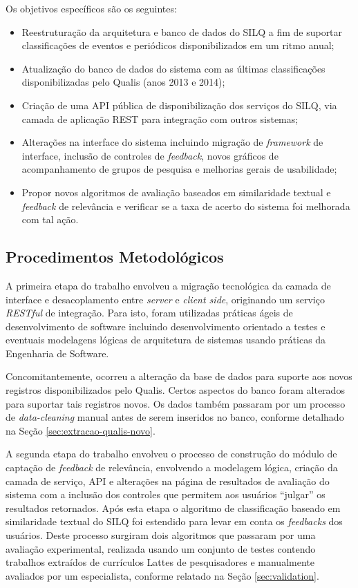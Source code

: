 \documentclass[12pt]{article}
\newcommand{\quotes}[1]{``#1''}
\begin{document}
Os objetivos específicos são os seguintes:

\begin{itemize}
    \item Reestruturação da arquitetura e banco de dados do SILQ a fim de suportar classificações de eventos e periódicos disponibilizados em um ritmo anual;

    \item Atualização do banco de dados do sistema com as últimas classificações disponibilizadas pelo Qualis (anos 2013 e 2014);

    \item Criação de uma API pública de disponibilização dos serviços do SILQ, via camada de aplicação REST para integração com outros sistemas;

    \item Alterações na interface do sistema incluindo migração de \textit{framework} de interface, inclusão de controles de \textit{feedback}, novos gráficos de acompanhamento de grupos de pesquisa e melhorias gerais de usabilidade;

    \item Propor novos algoritmos de avaliação baseados em similaridade textual e \textit{feedback} de relevância e verificar se a taxa de acerto do sistema foi melhorada com tal ação.
\end{itemize}

\subsection{Procedimentos Metodológicos}

A primeira etapa do trabalho envolveu a migração tecnológica da camada de interface e desacoplamento entre \textit{server} e \textit{client side}, originando um serviço \textit{RESTful} de integração. Para isto, foram utilizadas práticas ágeis de desenvolvimento de software incluindo desenvolvimento orientado a testes e eventuais modelagens lógicas de arquitetura de sistemas usando práticas da Engenharia de Software.

Concomitantemente, ocorreu a alteração da base de dados para suporte aos novos registros disponibilizados pelo Qualis. Certos aspectos do banco foram alterados para suportar tais registros novos. Os dados também passaram por um processo de \textit{data-cleaning} manual antes de serem inseridos no banco, conforme detalhado na Seção \ref{sec:extracao-qualis-novo}.

A segunda etapa do trabalho envolveu o processo de construção do módulo de captação de \textit{feedback} de relevância, envolvendo a modelagem lógica, criação da camada de serviço, API e alterações na página de resultados de avaliação do sistema com a inclusão dos controles que permitem aos usuários \quotes{julgar} os resultados retornados. Após esta etapa o algoritmo de classificação baseado em similaridade textual do SILQ foi estendido para levar em conta os \textit{feedbacks} dos usuários. Deste processo surgiram dois algoritmos que passaram por uma avaliação experimental, realizada usando um conjunto de testes contendo trabalhos extraídos de currículos Lattes de pesquisadores e manualmente avaliados por um especialista, conforme relatado na Seção \ref{sec:validation}.
\end{document}
